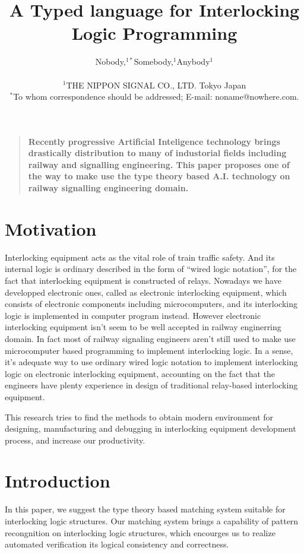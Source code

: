 \documentclass[12pt]{article}
\title{A Typed language for Interlocking Logic Programming}
\author
{Nobody,$^{1\ast}$Somebody,$^{1}$Anybody$^{1}$\\
\\
\normalsize{$^{1}$THE NIPPON SIGNAL CO., LTD. Tokyo Japan}\\
\normalsize{$^\ast$To whom correspondence should be addressed;
  E-mail: noname@nowhere.com.}
}
\date{}
\newenvironment{sciabstract}{%
\begin{quote} \bf}
{\end{quote}}
\begin{document}
 


\baselineskip24pt


\maketitle 




\begin{sciabstract}
  Recently progressive Artificial Inteligence technology brings drastically
  distribution to many of industorial fields including railway and
  signalling engineering. This paper proposes one of the way to
  make use the type theory based A.I. technology on railway signalling
  engineering domain.
\end{sciabstract}


\section{Motivation}
Interlocking equipment acts as the vital role of train traffic safety. And
its internal logic is ordinary described in the form of ``wired logic
notation'', for the fact that interlocking equipment is constructed of
relays.
Nowadays we have developped electronic ones, called as electronic
interlocking equipment, which consists of electronic components including
microcomputers, and its interlocking logic is implemented in computer
program instead.
However electronic interlocking equipment isn't seem to be well accepted in
railway enginerring domain. In fact most of railway signaling engineers
aren't still used to make use microcomputer based programming to implement
interlocking logic.
In a sense, it's adequate way to use ordinary wired logic notation to
implement interlocking logic on electronic interlocking equipment,
accounting on the fact that the engineers have plenty experience in design
of traditional relay-based interlocking equipment.

This research tries to find the methods to obtain modern environment
for designing, manufacturing and debugging in interlocking
equipment development process, and increase our productivity.


\section{Introduction}
In this paper, we suggest the type theory based matching system suitable
for interlocking logic structures. Our matching system brings a capability
of pattern recongnition on interlocking logic structures, which encourges us
to realize automated verification its logical consistency and correctness.
\end{document}
